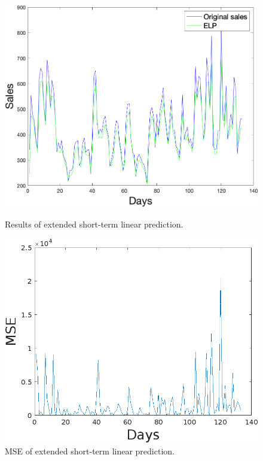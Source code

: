         \begin{figure}[h]
            \centering
            \begin{minipage}{0.45\textwidth}
                \centering
                \includegraphics[width=1\textwidth]{figures/expELP.png}
                \caption{Results of extended short-term linear prediction.}
                \label{fig:eslpres}
            \end{minipage}\hfill
            \begin{minipage}{0.45\textwidth}
                \centering
                \includegraphics[width=1\textwidth]{figures/expMseELP.png}
                \caption{MSE of extended short-term linear prediction.}
                \label{fig:eslpmse}
            \end{minipage}
        \end{figure}


